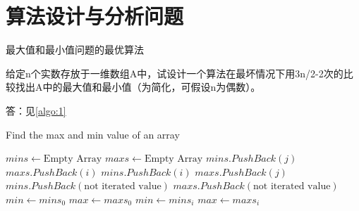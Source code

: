\documentclass{ctexart}
\begin{document}
\section{算法设计与分析问题}

\begin{outline}[enumerate]

\1 最大值和最小值问题的最优算法

给定n个实数存放于一维数组A中，试设计一个算法在最坏情况下用3n/2-2次的比较找出A中的最大值和最小值（为简化，可假设n为偶数）。

答：见\cref{algo:1}

\begin{algorithm}
    \caption{Find the max and min value of an array}
    \begin{algorithmic}[1]
        \label{algo:1}
         
            \State $mins \gets \text{Empty Array}$
            \State $maxs \gets \text{Empty Array}$
             
                    \State $mins.PushBack(j) $
                    \State $maxs.PushBack(i) $
                \Else
                    \State $mins.PushBack(i) $
                    \State $maxs.PushBack(j) $
                \EndIf
            \EndFor
                \State $mins.PushBack(\text{not iterated value})$
                \State $maxs.PushBack(\text{not iterated value})$
            \EndIf
            \State $min \gets mins_0$
            \State $max \gets maxs_0$
             
                    \State $min \gets mins_i$
                \EndIf
            \EndFor
             
                    \State $max \gets maxs_i$
                \EndIf
            \EndFor

\end{algorithmic}
\end{algorithm}
\end{outline}
\end{document}
